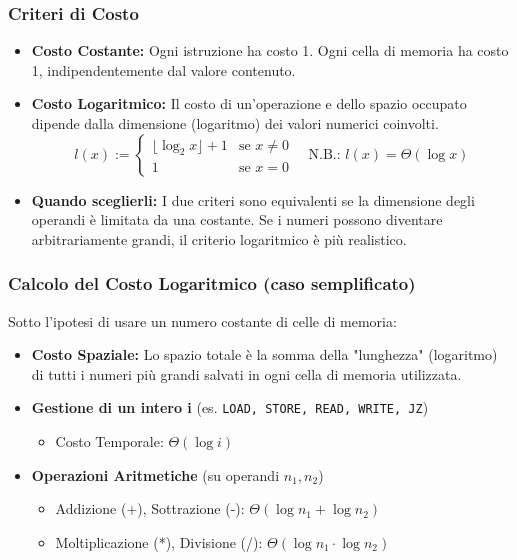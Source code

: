 \subsubsection*{Criteri di Costo}
\begin{itemize}
    \item \textbf{Costo Costante:} Ogni istruzione ha costo 1. Ogni cella di memoria ha costo 1, indipendentemente dal valore contenuto.
    \item \textbf{Costo Logaritmico:} Il costo di un'operazione e dello spazio occupato dipende dalla dimensione (logaritmo) dei valori numerici coinvolti.
    $$
    l(x) := 
    \begin{cases}
        \lfloor \log_2 x \rfloor + 1 & \text{se } x \neq 0 \\
        1 & \text{se } x = 0
    \end{cases}
    \quad \text{N.B.: } l(x) = \Theta(\log x)
    $$
    \item \textbf{Quando sceglierli:} I due criteri sono equivalenti se la dimensione degli operandi è limitata da una costante. Se i numeri possono diventare arbitrariamente grandi, il criterio logaritmico è più realistico.
\end{itemize}

\subsubsection*{Calcolo del Costo Logaritmico (caso semplificato)}
Sotto l'ipotesi di usare un numero costante di celle di memoria:
\begin{itemize}
    \item \textbf{Costo Spaziale:} Lo spazio totale è la somma della "lunghezza" (logaritmo) di tutti i numeri più grandi salvati in ogni cella di memoria utilizzata.
    \item \textbf{Gestione di un intero i} (es. \texttt{LOAD, STORE, READ, WRITE, JZ})
    \begin{itemize}
        \item Costo Temporale: $\Theta(\log i)$
    \end{itemize}
    \item \textbf{Operazioni Aritmetiche} (su operandi $n_1, n_2$)
    \begin{itemize}
        \item Addizione (+), Sottrazione (-): $\Theta(\log n_1 + \log n_2)$
        \item Moltiplicazione (*), Divisione (/): $\Theta(\log n_1 \cdot \log n_2)$
    \end{itemize}
\end{itemize}

